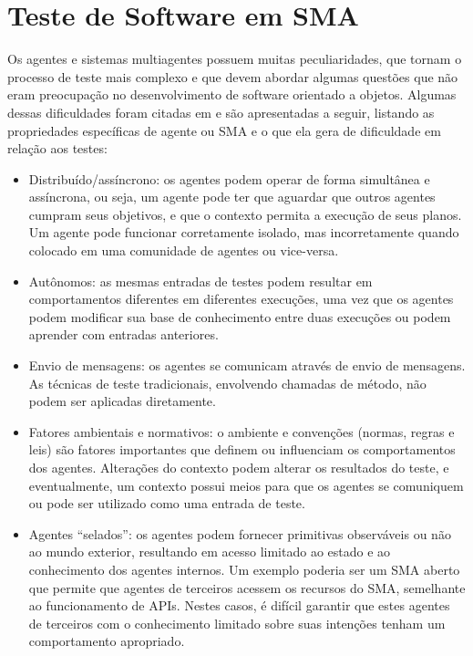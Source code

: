 \section{Teste de Software em SMA} \label{sec:testesma}

Os agentes e sistemas multiagentes possuem muitas peculiaridades, que tornam o processo de teste mais complexo e que devem abordar algumas questões que não eram preocupação no desenvolvimento de software orientado a objetos. Algumas dessas dificuldades foram citadas em \cite{rouff2002test,houhamdi2011multi,nguyen2009thesis} e são apresentadas a seguir, listando as propriedades específicas de agente ou SMA e o que ela gera de dificuldade em relação aos testes:

\begin{itemize}
\item Distribuído/assíncrono: os agentes podem operar de forma simultânea e assíncrona, ou seja, um agente pode ter que aguardar que outros agentes cumpram seus objetivos, e que o contexto permita a execução de seus planos. Um agente pode funcionar corretamente isolado, mas incorretamente quando colocado em uma comunidade de agentes ou vice-versa.
\item Autônomos: as mesmas entradas de testes podem resultar em comportamentos diferentes em diferentes execuções, uma vez que os agentes podem modificar sua base de conhecimento entre duas execuções ou podem aprender com entradas anteriores.
\item Envio de mensagens: os agentes se comunicam através de envio de mensagens. As técnicas de teste tradicionais, envolvendo chamadas de método, não podem ser aplicadas diretamente.
\item Fatores ambientais e normativos: o ambiente e convenções (normas, regras e leis) são fatores importantes que definem ou influenciam os comportamentos dos agentes. Alterações do contexto podem alterar os resultados do teste, e eventualmente, um contexto possui meios para que os agentes se comuniquem ou pode ser utilizado como uma entrada de teste.
\item Agentes “selados”: os agentes podem fornecer primitivas observáveis ou não ao mundo exterior, resultando em acesso limitado ao estado e ao conhecimento dos agentes internos. Um exemplo poderia ser um SMA aberto que permite que agentes de terceiros acessem os recursos do SMA, semelhante ao funcionamento de APIs. Nestes casos, é difícil garantir que estes agentes de terceiros com o conhecimento limitado sobre suas intenções tenham um comportamento apropriado.
\end{itemize}

